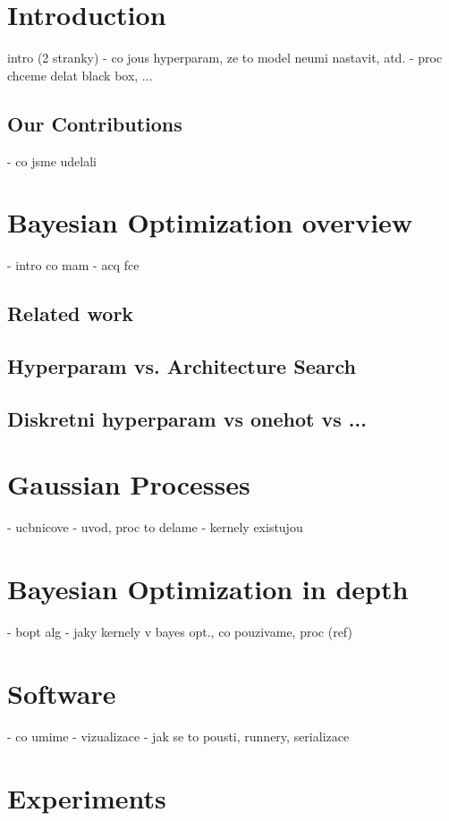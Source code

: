\chapter{Introduction}
intro (2 stranky)
  - co jous hyperparam, ze to model neumi nastavit, atd.
  - proc chceme delat black box, ...

\section{Our Contributions}
- co jsme udelali


\chapter{Bayesian Optimization overview}

- intro co mam
- acq fce

\section{Related work}
\section{Hyperparam vs. Architecture Search}
\section{Diskretni hyperparam vs onehot vs ...}


\chapter{Gaussian Processes}

- ucbnicove
- uvod, proc to delame
- kernely existujou

\chapter{Bayesian Optimization in depth}

- bopt alg
- jaky kernely v bayes opt., co pouzivame, proc (ref)


\chapter{Software}

- co umime
- vizualizace
- jak se to pousti, runnery, serializace

\chapter{Experiments}

